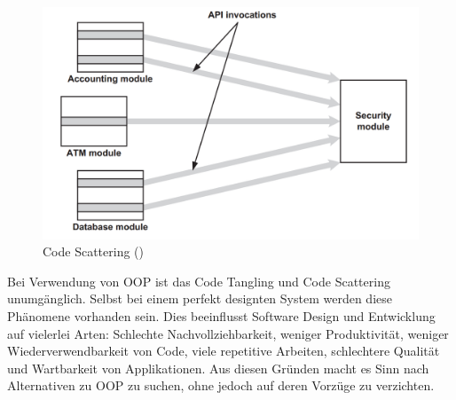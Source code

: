 \begin{figure}[H]
	\centering
		\includegraphics[scale=0.5]{bilder/motivationsCodeScattering}
	\caption{Code Scattering (\cite[p~54]{laddad:aspectj})}
	\label{fig:motivationcs}
\end{figure}

Bei Verwendung von OOP ist das Code Tangling und Code Scattering unumgänglich. Selbst bei einem perfekt designten System werden diese Phänomene vorhanden sein. Dies beeinflusst Software Design und Entwicklung auf vielerlei Arten: Schlechte Nachvollziehbarkeit, weniger Produktivität, weniger Wiederverwendbarkeit von Code, viele repetitive Arbeiten, schlechtere Qualität und Wartbarkeit von Applikationen. Aus diesen Gründen macht es Sinn nach Alternativen zu OOP zu suchen, ohne jedoch auf deren Vorzüge zu verzichten.

